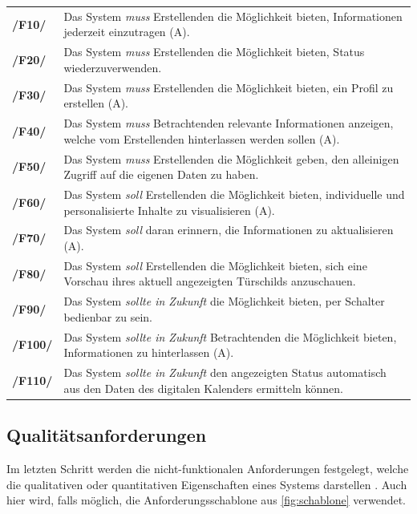 \begin{center}
    \renewcommand{\arraystretch}{1.5}
    \begin{tabular}{p{}p{}}
    \hline
            \textbf{/F10/} & Das System \textit{muss} Erstellenden die Möglichkeit bieten, Informationen jederzeit einzutragen (A).\\
            \textbf{/F20/} & Das System \textit{muss} Erstellenden die Möglichkeit bieten, Status wiederzuverwenden.\\
            \textbf{/F30/} & Das System \textit{muss} Erstellenden die Möglichkeit bieten, ein Profil zu erstellen (A).\\
            \textbf{/F40/} & Das System \textit{muss} Betrachtenden relevante Informationen anzeigen, welche vom Erstellenden hinterlassen werden sollen (A).\\
            \textbf{/F50/} & Das System \textit{muss} Erstellenden die Möglichkeit geben, den alleinigen Zugriff auf die eigenen Daten zu haben.\\
            \textbf{/F60/} & Das System \textit{soll} Erstellenden die Möglichkeit bieten, individuelle und personalisierte Inhalte zu visualisieren (A).\\
            \textbf{/F70/} & Das System \textit{soll} daran erinnern, die Informationen zu aktualisieren (A).\\
            \textbf{/F80/} & Das System \textit{soll} Erstellenden die Möglichkeit bieten, sich eine Vorschau ihres aktuell angezeigten Türschilds anzuschauen.\\
            \textbf{/F90/} & Das System \textit{sollte in Zukunft} die Möglichkeit bieten, per Schalter bedienbar zu sein.\\
            \textbf{/F100/} & Das System \textit{sollte in Zukunft} Betrachtenden die Möglichkeit bieten, Informationen zu hinterlassen (A).\\
            \textbf{/F110/} & Das System \textit{sollte in Zukunft} den angezeigten Status automatisch aus den Daten des digitalen Kalenders ermitteln können.\\
    \hline
    \end{tabular}
\end{center}


\subsection*{Qualitätsanforderungen}
\label{section:qualität}
Im letzten Schritt werden die nicht-funktionalen Anforderungen festgelegt, welche die qualitativen oder quantitativen Eigenschaften eines Systems darstellen \cite{balzert2009}. Auch hier wird, falls möglich, die Anforderungsschablone aus \ref{fig:schablone} verwendet.

